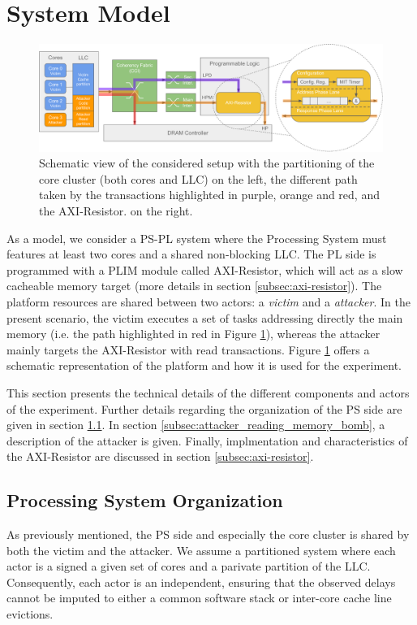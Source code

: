 \section{System Model}
    \label{sec:system_model}
    \begin{figure}
        \centering
        \includegraphics[scale=0.56]{images/Evaluation_setup.pdf}
        \caption{Schematic view of the considered setup with the partitioning of the core cluster (both cores and LLC) on the left, the different path taken by the transactions highlighted in purple, orange and red, and the AXI-Resistor. on the right.}
        \label{fig:system_schematic}
    \end{figure}

    As a model, we consider a PS-PL system where the Processing System must features at least two cores and a shared non-blocking LLC.
    The PL side is programmed with a PLIM module called AXI-Resistor, which will act as a slow cacheable memory target (more details in section \ref{subsec:axi-resistor}).
    The platform resources are shared between two actors: a \emph{victim} and a \emph{attacker}.
    In the present scenario, the victim executes a set of tasks addressing directly the main memory (i.e. the path highlighted in red in Figure \ref{fig:system_schematic}), whereas the attacker mainly targets the AXI-Resistor with read transactions.
    Figure \ref{fig:system_schematic} offers a schematic representation of the platform and how it is used for the experiment.

    This section presents the technical details of the different components and actors of the experiment.
    Further details regarding the organization of the PS side are given in section \ref{subsec:processing_system_organization}.
    In section \ref{subsec:attacker_reading_memory_bomb}, a description of the attacker is given.
    Finally, implmentation and characteristics of the AXI-Resistor are discussed in section \ref{subsec:axi-resistor}.

    \subsection{Processing System Organization}
        \label{subsec:processing_system_organization}
        As previously mentioned, the PS side and especially the core cluster is shared by both the victim and the attacker.
        We assume a partitioned system where each actor is a signed a given set of cores and a parivate partition of the LLC.
        Consequently, each actor is an independent, ensuring that the observed delays cannot be imputed to either a common software stack or inter-core cache line evictions.

